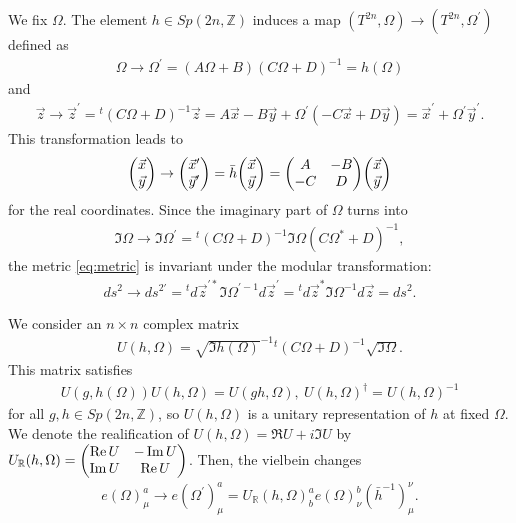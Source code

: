 \documentclass[11pt]{article}
\begin{document}

We fix $\Omega$. The element $h \in Sp(2n, \mathbb{Z})$ induces a map $(T^{2n}, \Omega) \to (T^{2n}, \Omega^\prime)$ defined as
\begin{align}
    \Omega \to  \Omega^\prime= (A\Omega+B)(C\Omega+D)^{-1}=h(\Omega)
\end{align}
and
\begin{align}
    \vec{z}\to \vec{z}^\prime= {}^t( C\Omega +D )^{-1}\vec{z}=  A \vec{x}-B \vec{y }+ \Omega^\prime ( -C \Vec{x} +D \vec{y})= \vec{x}^\prime+ \Omega^\prime  \vec{y}^\prime.
\end{align}
This transformation leads to
\begin{align}
    \mqty(\vec{x} \\ \vec{y}) \to  \mqty(\vec{x}^\prime \\ \vec{y}^\prime)= \bar{h}\mqty(\vec{x} \\ \vec{y})  =\mqty(A & -B \\ -C & D) \mqty(\vec{x} \\ \vec{y}) 
\end{align}
for the real coordinates. Since the imaginary part of $\Omega$ turns into
\begin{align}
    \Im \Omega \to \Im \Omega^\prime ={}^t(C \Omega+D)^{-1} \Im \Omega (C \Omega^\ast+D)^{-1},
\end{align}
the metric \eqref{eq:metric} is invariant under the modular transformation:
\begin{align}
    ds^2 \to ds^{2\prime} = {}^t d \vec{z}^{\prime \ast} \Im \Omega^{\prime -1} d\vec{z}^\prime={}^t d \vec{z}^\ast \Im \Omega^{-1} d\vec{z}=ds^2.
\end{align}

We consider an $n\times n$ complex matrix
\begin{align}
    U(h,\Omega)= \sqrt{\Im h(\Omega)}^{-1} {}^t (C\Omega +D)^{-1} \sqrt{\Im \Omega} .
\end{align}
This matrix satisfies
\begin{align}
    U(g, h(\Omega))U(h,\Omega)=U(gh ,\Omega),~U(h,\Omega)^\dagger=U(h,\Omega)^{-1}
\end{align}
for all $g,h \in Sp(2n ,\mathbb{Z})$, so $U(h,\Omega)$ is a unitary representation of $h$ at fixed $\Omega$. We denote the realification of $U(h,\Omega)=\Re U +i \Im U$ by $U_\mathbb{R}(h,\Omega)=\mqty( \Re U & - \Im U \\ \Im U & \Re U)$. Then, the vielbein changes 
\begin{align}
     e(\Omega) ^a_\mu \to e(\Omega^\prime)^a_\mu = U_\mathbb{R}(h,\Omega)^a_b e(\Omega)^b_\nu (\bar{h}^{-1})^\nu_\mu  \label{eq:action on vielbein}. 
\end{align} 
\end{document}
